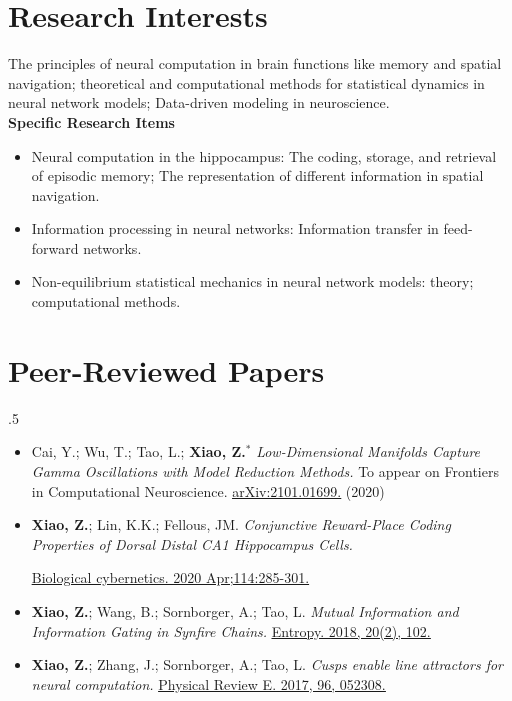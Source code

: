 \documentclass[margin, 11pt]{res} %
\begin{document}
\begin{resume}
\section{Research Interests}
\label{Research}
The principles of neural computation in brain functions like memory and spatial navigation; theoretical and computational methods for statistical dynamics in neural network models; Data-driven modeling in neuroscience.\\
{\bf Specific Research Items}
\begin{itemize}
    \item Neural computation in the hippocampus: The coding, storage, and retrieval of episodic memory; The representation of different information in spatial navigation.
    \item Information processing in neural networks: Information transfer in feed-forward networks.
    \item Non-equilibrium statistical mechanics in neural network models: theory; computational methods.
\end{itemize}

\section{Peer-Reviewed Papers}
\label{Publications1}
\moveleft.5\hoffset\centerline{  } %
\begin{itemize}
\item Cai, Y.; Wu, T.; Tao, L.; \textbf{Xiao, Z.$^*$} \textit{Low-Dimensional Manifolds Capture Gamma Oscillations with Model Reduction Methods.} To appear on Frontiers in Computational Neuroscience. \href{https://arxiv.org/abs/2101.01699}{\underline{arXiv:2101.01699.}} (2020)

\item  \textbf{Xiao, Z.}; Lin, K.K.; Fellous, JM. \textit{Conjunctive Reward-Place Coding Properties of Dorsal Distal CA1 Hippocampus Cells.}

\href{https://link.springer.com/article/10.1007/s00422-020-00830-0}{\underline{Biological cybernetics. 2020 Apr;114:285-301.}}


\item \textbf{Xiao, Z.}; Wang, B.; Sornborger, A.; Tao, L. \textit{Mutual Information and Information Gating in Synfire Chains.} \href{https://www.mdpi.com/1099-4300/20/2/102}{\underline{Entropy. 2018, 20(2), 102.}}

\item \textbf{Xiao, Z.}; Zhang, J.; Sornborger, A.; Tao, L. \textit{Cusps enable line attractors for neural computation.} \href{https://journals.aps.org/pre/abstract/10.1103/PhysRevE.96.052308}{\underline{Physical Review E. 2017, 96, 052308.}}


\end{itemize}
\end{resume}
\end{document}
